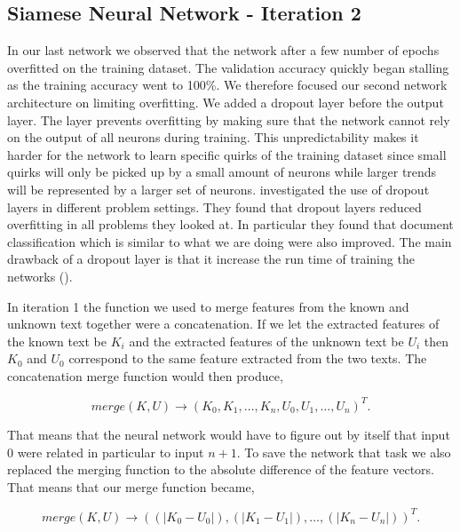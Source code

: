 \subsection{Siamese Neural Network - Iteration 2}


In our last network we observed that the network after a few number of epochs
overfitted on the training dataset. The validation accuracy quickly began
stalling as the training accuracy went to 100\%. We therefore focused our
second network architecture on limiting overfitting. We added a dropout layer
before the output layer. The layer prevents overfitting by making sure that
the network cannot rely on the output of all neurons during training. This
unpredictability makes it harder for the network to learn specific quirks of
the training dataset since small quirks will only be picked up by a small
amount of neurons while larger trends will be represented by a larger set
of neurons. \cite{JMLR:v15:srivastava14a} investigated the use of dropout
layers in different problem settings. They found that dropout layers reduced
overfitting in all problems they looked at. In particular they found that
document classification which is similar to what we are doing were also
improved. The main drawback of a dropout layer is that it increase the run time
of training the networks (\cite{JMLR:v15:srivastava14a}).

In iteration 1 the function we used to merge features from the known and unknown
text together were a concatenation. If we let the extracted features of the
known text be $K_i$ and the extracted features of the unknown text be $U_i$ then
$K_0$ and $U_0$ correspond to the same feature extracted from the two texts. The
concatenation merge function would then produce,

\begin{equation}
    merge(K, U) \rightarrow \left(
        K_0, K_1, \dots, K_n, U_0, U_1, \dots, U_n
    \right)^T.
\end{equation}

That means that the neural network would have to figure out by itself that input
$0$ were related in particular to input $n + 1$. To save the network that task
we also replaced the merging function to the absolute difference of the feature
vectors. That means that our merge function became,

\begin{equation}
    merge(K, U) \rightarrow \left(
        (|K_0 - U_0|), (|K_1 - U_1|), \dots, (|K_n - U_n|)
    \right)^T.
\end{equation}

